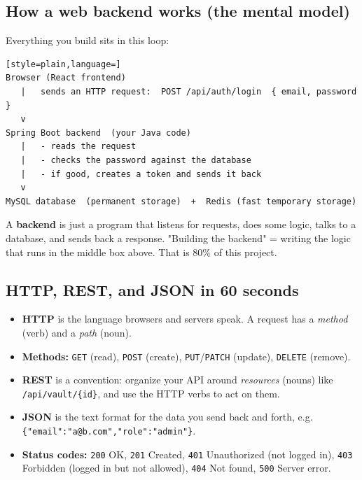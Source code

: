 \documentclass[11pt,a4paper]{article}
\begin{document}
\subsection{How a web backend works (the mental model)}

Everything you build sits in this loop:

\begin{lstlisting}[style=plain,language=]
Browser (React frontend)
   |   sends an HTTP request:  POST /api/auth/login  { email, password }
   v
Spring Boot backend  (your Java code)
   |   - reads the request
   |   - checks the password against the database
   |   - if good, creates a token and sends it back
   v
MySQL database  (permanent storage)  +  Redis (fast temporary storage)
\end{lstlisting}

\begin{keyidea}
A \textbf{backend} is just a program that listens for requests, does some logic, talks to a
database, and sends back a response. "Building the backend" = writing the logic that runs in the
middle box above. That is 80\% of this project.
\end{keyidea}

\subsection{HTTP, REST, and JSON in 60 seconds}

\begin{itemize}[leftmargin=*]
  \item \textbf{HTTP} is the language browsers and servers speak. A request has a \emph{method}
        (verb) and a \emph{path} (noun).
  \item \textbf{Methods:} \texttt{GET} (read), \texttt{POST} (create), \texttt{PUT}/\texttt{PATCH}
        (update), \texttt{DELETE} (remove).
  \item \textbf{REST} is a convention: organize your API around \emph{resources} (nouns) like
        \texttt{/api/vault/\{id\}}, and use the HTTP verbs to act on them.
  \item \textbf{JSON} is the text format for the data you send back and forth, e.g.
        \texttt{\{"email":"a@b.com","role":"admin"\}}.
  \item \textbf{Status codes:} \texttt{200} OK, \texttt{201} Created, \texttt{401} Unauthorized
        (not logged in), \texttt{403} Forbidden (logged in but not allowed), \texttt{404} Not found,
        \texttt{500} Server error.
\end{itemize}
\end{document}
